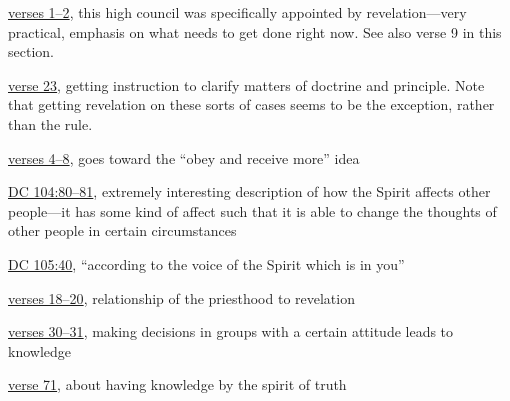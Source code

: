 \begin{compactdesc}
\begin{compactitem}
				\end{compactitem}
			\item[{\hyperref[DC102]{DC 102}}]
				\begin{compactitem}
					\item \hyperref[DC102-1]{verses 1--2}, this high council was specifically appointed by revelation---very practical, emphasis on what needs to get done right now. See also verse 9 in this section.
					\item \hyperref[DC102-23]{verse 23}, getting instruction to clarify matters of doctrine and principle. Note that getting revelation on these sorts of cases seems to be the exception, rather than the rule.
				\end{compactitem}
			\item[{\hyperref[DC103]{DC 103}}]
				\begin{compactitem}
					\item \hyperref[DC103-4]{verses 4--8}, goes toward the ``obey and receive more'' idea
				\end{compactitem}
			\item[{\hyperref[DC104]{DC 104}}]
				\begin{compactitem}
					\item \hyperref[DC104-80]{DC 104:80--81}, extremely interesting description of how the Spirit affects other people---it has some kind of affect such that it is able to change the thoughts of other people in certain circumstances
				\end{compactitem}
			\item[{\hyperref[DC105]{DC 105}}]
				\begin{compactitem}
					\item \hyperref[DC105-40]{DC 105:40}, ``according to the voice of the Spirit which is in you''
				\end{compactitem}
			\item[{\hyperref[DC107]{DC 107}}]
				\begin{compactitem}
					\item \hyperref[DC107-18]{verses 18--20}, relationship of the priesthood to revelation
					\item \hyperref[DC107-30]{verses 30--31}, making decisions in groups with a certain attitude leads to knowledge
					\item \hyperref[DC107-71]{verse 71}, about having knowledge by the spirit of truth
				\end{compactitem}
			\item[{\hyperref[DC109]{DC 109}}]

\end{compactdesc}
